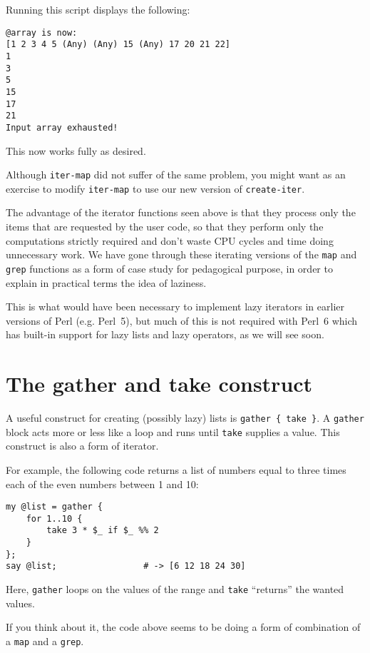 Running this script displays the following:
\begin{verbatim}
@array is now:
[1 2 3 4 5 (Any) (Any) 15 (Any) 17 20 21 22]
1
3
5
15
17
21
Input array exhausted!
\end{verbatim}

This now works fully as desired.

Although {\tt iter-map} did not suffer of the same problem, 
you might want as an exercise to modify {\tt iter-map}
to use our new version of {\tt create-iter}.

The advantage of the iterator functions seen above is that they 
process only the items that are requested by the user code, so 
that they perform only the computations strictly required and 
don't waste CPU cycles and time doing unnecessary work. We have 
gone through these iterating versions of the {\tt map} 
and {\tt grep} functions as a form of case study for 
pedagogical purpose, in order to explain in practical terms 
the idea of laziness. 

This is what would have been necessary to implement lazy 
iterators in earlier versions of Perl (e.g. Perl~5), but 
much of this is not required with Perl~6 which has built-in 
support for lazy lists and lazy operators, as we will see soon.

\section{The gather and take construct}

A useful construct for creating (possibly lazy) lists 
is  \verb'gather { take }'. A \verb'gather' block 
acts more or less like a loop and runs until 
\verb'take' supplies a value. This construct is also 
a form of iterator.

For example, the following code returns a list of 
numbers equal to three times each of the even numbers 
between 1 and 10:

\begin{verbatim}
my @list = gather { 
    for 1..10 {
        take 3 * $_ if $_ %% 2
    } 
};
say @list;                 # -> [6 12 18 24 30]
\end{verbatim}

Here, \verb'gather' loops on the values of the range 
and {\tt take} ``returns'' the wanted values.

If you think about it, the code above seems to 
be doing a form of combination of a {\tt map} and a 
{\tt grep}.

